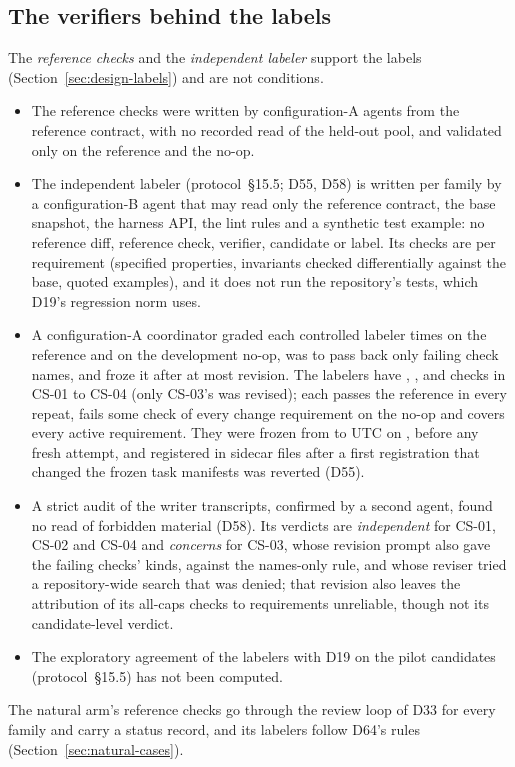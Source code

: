 \subsection{The verifiers behind the labels}
\label{sec:labelers}
The \emph{reference checks} and the \emph{independent labeler} support the labels (Section~\ref{sec:design-labels}) and
are not conditions.
\begin{itemize}
\item The reference checks were written by configuration-A agents from the reference contract, with no recorded read of
  the held-out pool, and validated only on the reference and the no-op.
\item The independent labeler (protocol~\S15.5; D55, D58) is written per family by a configuration-B agent that may read
  only the reference contract, the base snapshot, the harness API, the lint rules and a synthetic test example: no
  reference diff, reference check, verifier, candidate or label. Its checks are per requirement (specified properties,
  invariants checked differentially against the base, quoted examples), and it does not run the repository's tests,
  which D19's regression norm uses.
\item A configuration-A coordinator graded each controlled labeler  times on the reference
  and on the development no-op, was to pass back only failing check names, and froze it after at most
   revision. The labelers have , ,
   and  checks in CS-01 to CS-04 (only CS-03's was revised); each passes the
  reference in every repeat, fails some check of every change requirement on the no-op and covers every active
  requirement. They were frozen from  to  UTC on ,
  before any fresh attempt, and registered in sidecar files after a first registration that changed the frozen task
  manifests was reverted (D55).
\item A strict audit of the  writer transcripts, confirmed by a second agent, found no read of
  forbidden material (D58). Its verdicts are \emph{independent} for CS-01, CS-02 and CS-04 and \emph{concerns} for CS-03,
  whose revision prompt also gave the failing checks' kinds, against the names-only rule, and whose reviser tried a
  repository-wide search that was denied; that revision also leaves the attribution of its all-caps checks to
  requirements unreliable, though not its candidate-level verdict.
\item The exploratory agreement of the labelers with D19 on the  pilot candidates (protocol~\S15.5) has not
  been computed.
\end{itemize}
The natural arm's reference checks go through the review loop of D33 for every family and carry a status record, and
its labelers follow D64's rules (Section~\ref{sec:natural-cases}).

